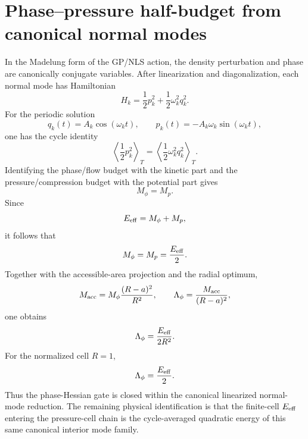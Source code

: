 \section{Phase--pressure half-budget from canonical normal modes}
\label{app:phase-pressure-self-duality}

In the Madelung form of the GP/NLS action, the density perturbation and phase
are canonically conjugate variables.  After linearization and diagonalization,
each normal mode has Hamiltonian
\[
  H_k
  =
  \frac12p_k^2+\frac12\omega_k^2q_k^2.
\]
For the periodic solution
\[
  q_k(t)=A_k\cos(\omega_k t),
  \qquad
  p_k(t)=-A_k\omega_k\sin(\omega_k t),
\]
one has the cycle identity
\[
  \left\langle\frac12p_k^2\right\rangle_T
  =
  \left\langle\frac12\omega_k^2q_k^2\right\rangle_T.
\]
Identifying the phase/flow budget with the kinetic part and the
pressure/compression budget with the potential part gives
\[
  M_\phi=M_p.
\]
Since
\[
  E_{\rm eff}=M_\phi+M_p,
\]
it follows that
\[
  M_\phi=M_p=\frac{E_{\rm eff}}2.
\]
Together with the accessible-area projection and the radial optimum,
\[
  M_{\rm acc}=M_\phi\frac{(R-a)^2}{R^2},
  \qquad
  \Lambda_\phi=\frac{M_{\rm acc}}{(R-a)^2},
\]
one obtains
\[
  \Lambda_\phi=\frac{E_{\rm eff}}{2R^2}.
\]
For the normalized cell \(R=1\),
\[
  \Lambda_\phi=\frac{E_{\rm eff}}2.
\]
Thus the phase-Hessian gate is closed within the canonical linearized
normal-mode reduction.  The remaining physical identification is that the
finite-cell \(E_{\rm eff}\) entering the pressure-cell chain is the
cycle-averaged quadratic energy of this same canonical interior mode family.
